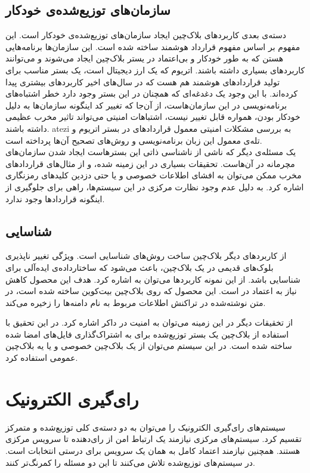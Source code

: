 \subsection{سازمان‌های توزیع‌شده‌ی خودکار}
دسته‌ی بعدی کاربرد‌های بلاک‌چین ایجاد سازمان‌های توزیع‌شده‌ی خودکار 
است. این مفهوم بر اساس مفهوم قرارداد هوشمند
\cite{SmartContract}
 ساخته شده است. این سازمان‌ها برنامه‌هایی هستن که به طور خودکار و بی‌اعتماد در یستر بلاک‌چین ایجاد می‌شوند و می‌توانند کاربرد‌های بسیاری داشته باشند. اتریوم
\cite{Ethereum}
که یک ارز دیجیتال است، یک بستر مناسب برای تولید قرارداد‌های هوشمند هم هست که در سال‌های اخیر کاربرد‌های بیشتری پیدا کرده‌اند. با این وجود یک دغدغه‌ای که همچنان در این بستر وجود دارد خطر اشتباه‌های برنامه‌نویسی در این سازمان‌هاست، از آن‌جا که تغییر کد اینگونه سازمان‌ها به دلیل خودکار بودن، همواره قابل تغییر نیست، اشتباهات امنیتی می‌تواند تاثیر مخرب عظیمی داشته باشند. atezi
\cite{surveyAtt}
به بررسی مشکلات امنیتی معمول قراردادهای در بستر اتریوم و تله‌ی معمول این زبان برنامه‌نویسی و روش‌های تصحیح آن‌ها پرداخته است. 
\\
یک‌ مسئله‌ی دیگر که ناشی از ناشناسی ذاتی این بستر‌هاست ایجاد شدن سازمان‌های مچرمانه در آن‌هاست. تحقیقات‌ بسیاری 
\cite{gyges} \cite{smart}
در این زمینه شده، و از مثال‌های قرارداد‌های مخرب ممکن می‌توان به افشای اطلاعات خصوصی و یا حتی دزدین کلید‌های رمز‌نگاری اشاره کرد. به دلیل عدم وجود نظارت مرکزی در این سیستم‌ها، راهی برای جلوگیری از اینگونه قرارداد‌ها وجود ندارد.
\subsection{شناسایی}
از کاربرد‌های دیگر بلا‌ک‌چین ساخت‌ روش‌های شناسایی
است. ویژگی تغییر ناپذیری بلوک‌های قدیمی در یک بلاک‌چین، باعث می‌شود که ساختارداده‌ی ایده‌آلی برای شناسایی باشد. از این نمونه کاربرد‌ها می‌توان به  اشاره کرد. هدف این محصول کاهش نیاز به اعتماد در 
 
است. این محصول که روی بلاک‌چین بیت‌کوین ساخته شده است، در متن نوشته‌شده در تراکنش اطلاعات مربوط به نام دامنه‌ها را زخیره می‌کند. 
\par
از تخقیقات دیگر در این زمینه می‌توان به امنیت در داکر
\cite{docker}
اشاره کرد. در این تحقیق با استفاده‌ از بلاک‌چین یک بستر توزیع‌شده برای به اشتراک‌گذاری فایل‌های امضا شده ساخته شده است. در این سیستم‌ می‌توان از یک بلاک‌چین خصوصی و یا یه بلاک‌چین عمومی استفاده کرد. 


\section{رای‌گیری الکترونیک}
سیستم‌های رای‌گیری الکترونیک را می‌توان به دو دسته‌ی کلی توزیع‌شده و متمرکز تقسیم کرد. سیستم‌های مرکزی نیازمند یک ارتباط امن از رای‌دهنده تا سرویس مرکزی هستند. همچنین نیازمند اعتماد کامل به همان یک سرویس برای درستی انتخابات است. در سیستم‌های توزیع‌شده تلاش می‌کنند تا این دو مسئله را کمرنگ‌تر کنند.

